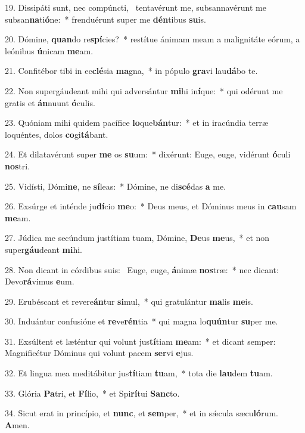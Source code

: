 19. Dissipáti sunt, nec compúncti, \dag\  tentavérunt me, subsannavérunt me subsan\textbf{na}ti\textbf{ó}ne:~*  frenduérunt super me \textbf{dén}tibus \textbf{su}is.\

20. Dómine, \textbf{quan}do re\textbf{spí}cies?~*  restítue ánimam meam a malignitáte eórum, a leónibus \textbf{ú}nicam \textbf{me}am.\

21. Confitébor tibi in ec\textbf{clé}sia \textbf{ma}gna,~*  in pópulo \textbf{gra}vi lau\textbf{dá}bo te.\

22. Non supergáudeant mihi qui adversántur \textbf{mi}hi in\textbf{í}que:~*  qui odérunt me gratis et \textbf{án}nuunt \textbf{ó}culis.\

23. Quóniam mihi quidem pacífice \textbf{lo}que\textbf{bán}tur:~*  et in iracúndia terræ loquéntes, dolos \textbf{co}gi\textbf{tá}bant.\

24. Et dilatavérunt super \textbf{me} os \textbf{su}um:~*  dixérunt: Euge, euge, vidérunt \textbf{ó}culi \textbf{nos}tri.\

25. Vidísti, Dómi\textbf{ne}, ne \textbf{sí}leas:~*  Dómine, ne di\textbf{scé}das \textbf{a} me.\

26. Exsúrge et inténde ju\textbf{dí}cio \textbf{me}o:~*  Deus meus, et Dóminus meus in \textbf{cau}sam \textbf{me}am.\

27. Júdica me secúndum justítiam tuam, Dómine, \textbf{De}us \textbf{me}us,~*  et non super\textbf{gáu}deant \textbf{mi}hi.\

28. Non dicant in córdibus suis: \dag\  Euge, euge, \textbf{á}nimæ \textbf{nos}træ:~*  nec dicant: Devo\textbf{rá}vimus \textbf{e}um.\

29. Erubéscant et revere\textbf{án}tur \textbf{si}mul,~*  qui gratulántur \textbf{ma}lis \textbf{me}is.\

30. Induántur confusióne et \textbf{re}ve\textbf{rén}tia~*  qui magna lo\textbf{quún}tur \textbf{su}per me.\

31. Exsúltent et læténtur qui volunt jus\textbf{tí}tiam \textbf{me}am:~*  et dicant semper: Magnificétur Dóminus qui volunt pacem \textbf{ser}vi \textbf{e}jus.\

32. Et lingua mea meditábitur jus\textbf{tí}tiam \textbf{tu}am,~*  tota die \textbf{lau}dem \textbf{tu}am.\

33. Glória \textbf{Pa}tri, et \textbf{Fí}lio,~*  et Spi\textbf{rí}tui \textbf{Sanc}to.\

34. Sicut erat in princípio, et \textbf{nunc}, et \textbf{sem}per,~*  et in sǽcula sæcu\textbf{ló}rum. \textbf{A}men.\

